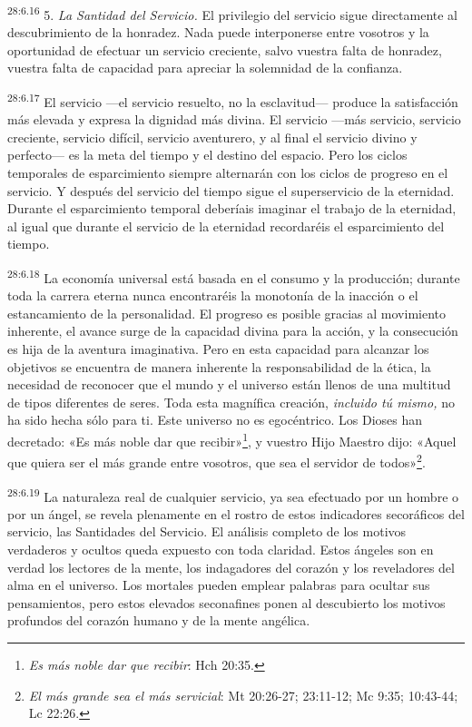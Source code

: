 \par
\textsuperscript{28:6.16} 5. \textit{La Santidad del Servicio.} El privilegio del servicio sigue directamente al descubrimiento de la honradez. Nada puede interponerse entre vosotros y la oportunidad de efectuar un servicio creciente, salvo vuestra falta de honradez, vuestra falta de capacidad para apreciar la solemnidad de la confianza.

\par
\textsuperscript{28:6.17} El servicio ---el servicio resuelto, no la esclavitud--- produce la satisfacción más elevada y expresa la dignidad más divina. El servicio ---más servicio, servicio creciente, servicio difícil, servicio aventurero, y al final el servicio divino y perfecto--- es la meta del tiempo y el destino del espacio. Pero los ciclos temporales de esparcimiento siempre alternarán con los ciclos de progreso en el servicio. Y después del servicio del tiempo sigue el superservicio de la eternidad. Durante el esparcimiento temporal deberíais imaginar el trabajo de la eternidad, al igual que durante el servicio de la eternidad recordaréis el esparcimiento del tiempo.

\par
\textsuperscript{28:6.18} La economía universal está basada en el consumo y la producción; durante toda la carrera eterna nunca encontraréis la monotonía de la inacción o el estancamiento de la personalidad. El progreso es posible gracias al movimiento inherente, el avance surge de la capacidad divina para la acción, y la consecución es hija de la aventura imaginativa. Pero en esta capacidad para alcanzar los objetivos se encuentra de manera inherente la responsabilidad de la ética, la necesidad de reconocer que el mundo y el universo están llenos de una multitud de tipos diferentes de seres. Toda esta magnífica creación, \textit{incluido tú mismo,} no ha sido hecha sólo para ti. Este universo no es egocéntrico. Los Dioses han decretado: «Es más noble dar que recibir»\footnote{\textit{Es más noble dar que recibir}: Hch 20:35.}, y vuestro Hijo Maestro dijo: «Aquel que quiera ser el más grande entre vosotros, que sea el servidor de todos»\footnote{\textit{El más grande sea el más servicial}: Mt 20:26-27; 23:11-12; Mc 9:35; 10:43-44; Lc 22:26.}.

\par
\textsuperscript{28:6.19} La naturaleza real de cualquier servicio, ya sea efectuado por un hombre o por un ángel, se revela plenamente en el rostro de estos indicadores secoráficos del servicio, las Santidades del Servicio. El análisis completo de los motivos verdaderos y ocultos queda expuesto con toda claridad. Estos ángeles son en verdad los lectores de la mente, los indagadores del corazón y los reveladores del alma en el universo. Los mortales pueden emplear palabras para ocultar sus pensamientos, pero estos elevados seconafines ponen al descubierto los motivos profundos del corazón humano y de la mente angélica.

